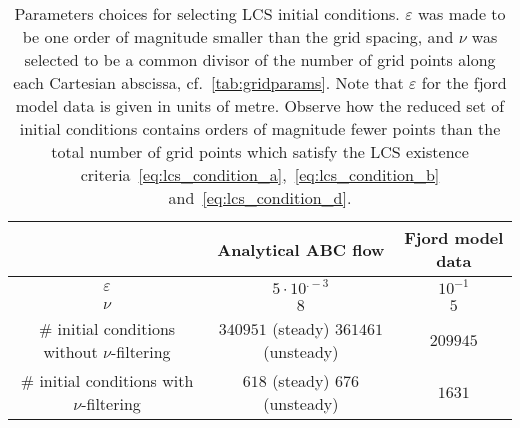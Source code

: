 \begin{table}[htpb]
    \centering
    \caption[Parameters choices for selecting LCS initial conditions]
    {Parameters choices for selecting LCS initial conditions. $\varepsilon$ was
    made to be one order of magnitude smaller than the grid spacing, and
    $\nu$ was selected to be a common divisor of the number of grid points
    along each Cartesian abscissa, cf.\ \cref{tab:gridparams}. Note that
    $\varepsilon$ for the fjord model data is given in units of metre. Observe
    how the reduced set of initial conditions contains orders of magnitude
    fewer points than the total number of grid points which satisfy the LCS
    existence criteria~\eqref{eq:lcs_condition_a},~\eqref{eq:lcs_condition_b}
    and~\eqref{eq:lcs_condition_d}.}
    \label{tab:initialconditionparams}
    \begin{tabular}{ccc}
        \toprule
        & Analytical ABC flow & Fjord model data\\
        \midrule
        $\varepsilon$ & $5\cdot10^{.-3}$ & $10^{-1}$\\
        $\nu$ & $8$ & $5$ \\[3pt]
        \makecell[c]{\# initial conditions\\without $\nu$-filtering} & \makecell[c]{$340951$ (steady) \\ $361461$ (unsteady)} & $209945$\\[9pt]
        \makecell[c]{\# initial conditions\\with $\nu$-filtering} & \makecell[c]{$618$ (steady)\\$676$ (unsteady)} & $1631$\\
        \bottomrule
    \end{tabular}
\end{table}
